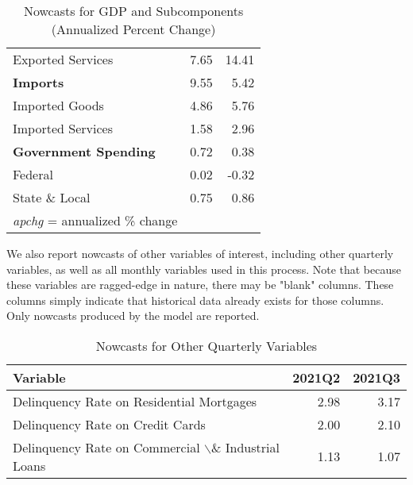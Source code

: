 \documentclass[11pt, letterpaper]{article}\usepackage[]{graphicx}\usepackage[]{color}
\begin{document}
\begin{table}[H]
\begin{tabular}{lrr}
  \hspace{8mm}  Exported Services & 7.65 & 14.41 \\ 
  \hspace{0mm} \textbf{Imports} & 9.55 & 5.42 \\ 
  \hspace{8mm}  Imported Goods & 4.86 & 5.76 \\ 
  \hspace{8mm}  Imported Services & 1.58 & 2.96 \\ 
  \hspace{0mm} \textbf{Government Spending} & 0.72 & 0.38 \\ 
  \hspace{8mm}  Federal & 0.02 & -0.32 \\ 
  \hspace{8mm}  State \& Local & 0.75 & 0.86 \\ 
   \hline 
 \textit{apchg} = annualized \% change 
\end{tabular}
\endgroup
\caption{Nowcasts for GDP and Subcomponents (Annualized Percent Change)} 
\end{table}


We also report nowcasts of other variables of interest, including other quarterly variables, as well as all monthly variables used in this process. Note that because these variables are ragged-edge in nature, there may be "blank" columns. These columns simply indicate that historical data already exists for those columns. Only nowcasts produced by the model are reported.
\begin{table}[H]
\centering
\begingroup\fontsize{11pt}{13pt}\selectfont
\begin{tabular}{lrr}
  \hline
Variable & 2021Q2 & 2021Q3 \\ 
  \hline
Delinquency Rate on Residential Mortgages & 2.98 & 3.17 \\ 
  Delinquency Rate on Credit Cards & 2.00 & 2.10 \\ 
  Delinquency Rate on Commercial $\backslash$\& Industrial Loans & 1.13 & 1.07 \\ 
   \hline
\end{tabular}
\endgroup
\caption{Nowcasts for Other Quarterly Variables} 
\end{table}
\end{document}
